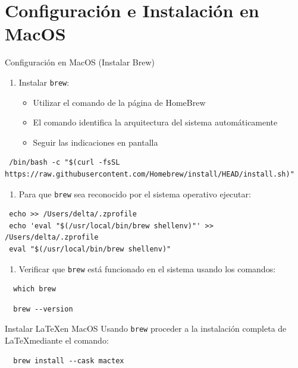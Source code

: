\documentclass[presentation]{beamer}
\begin{document}
\section{Configuración e Instalación en MacOS}
\label{sec:org51c5e2c}
\begin{frame}{Configuración en MacOS (Instalar Brew)}
 \begin{enumerate}
\item \alert{Instalar \texttt{brew}:}
\begin{itemize}
\item Utilizar el comando de la página de HomeBrew
\item El comando identifica la arquitectura del sistema automáticamente
\item Seguir las indicaciones en pantalla
\end{itemize}
\end{enumerate}

\begin{verbatim}
 /bin/bash -c "$(curl -fsSL https://raw.githubusercontent.com/Homebrew/install/HEAD/install.sh)"
\end{verbatim}

\begin{enumerate}
\item Para que \texttt{brew} sea reconocido por el sistema operativo ejecutar:
\end{enumerate}

\begin{verbatim}
 echo >> /Users/delta/.zprofile
 echo 'eval "$(/usr/local/bin/brew shellenv)"' >> /Users/delta/.zprofile
 eval "$(/usr/local/bin/brew shellenv)"
\end{verbatim}

\begin{enumerate}
\item Verificar que \texttt{brew} está funcionado en el sistema usando los
comandos:
\end{enumerate}
\begin{verbatim}
  which brew
\end{verbatim}

\begin{verbatim}
  brew --version
\end{verbatim}
\end{frame}
\begin{frame}[label={sec:org13c2d8d},fragile]{Instalar \LaTeX en MacOS}
 Usando \texttt{brew} proceder a la instalación completa de \LaTeX mediante
el comando:

\begin{verbatim}
  brew install --cask mactex
\end{verbatim}
\end{frame}
\end{document}
